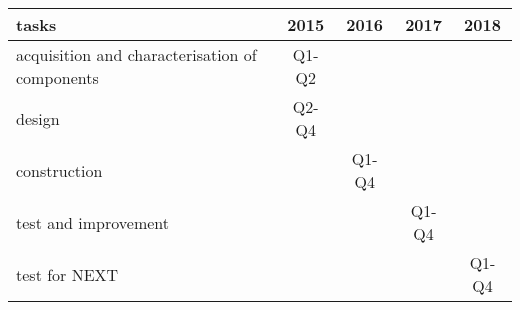 \begin{center}
\begin{tabular}{| l | c | c | c | c |}
\hline
tasks & 2015 & 2016 & 2017 & 2018 \\
\hline
acquisition and characterisation of components  & Q1-Q2 & & &  \\
design  & Q2-Q4  & & & \\
construction &  & Q1-Q4 & & \\
test and improvement &  & & Q1-Q4 & \\
test for NEXT & & &  & Q1-Q4\\
\hline
\hline
\end{tabular}
\label{tab:schedule_laser}
\end{center}
